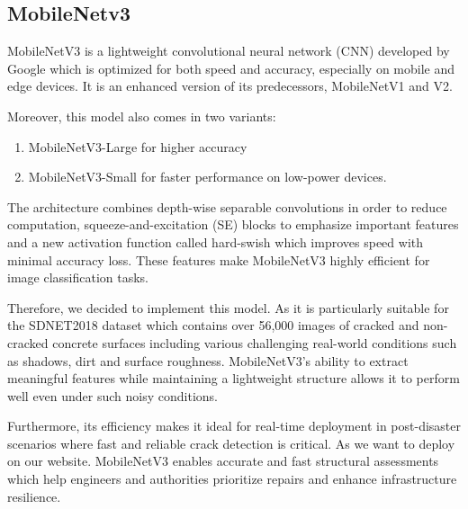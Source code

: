 \subsection{MobileNetv3}

MobileNetV3 is a lightweight convolutional neural network (CNN) developed by Google which is optimized for both speed and accuracy, especially on mobile and edge devices. It is an enhanced version of its predecessors, MobileNetV1 and V2.\cite{Qian2021}\cite{howard2019searchingmobilenetv3}

Moreover, this model also comes in two variants:

\begin{enumerate}
	\item MobileNetV3-Large for higher accuracy
	\item MobileNetV3-Small for faster performance on low-power devices.
\end{enumerate}

The architecture combines depth-wise separable convolutions in order to reduce computation, squeeze-and-excitation (SE) blocks to emphasize important features and a new activation function called hard-swish which improves speed with minimal accuracy loss. These features make MobileNetV3 highly efficient for image classification tasks.

Therefore, we decided to implement this model. As it is particularly suitable for the SDNET2018 dataset which contains over 56,000 images of cracked and non-cracked concrete surfaces including various challenging real-world conditions such as shadows, dirt and surface roughness. MobileNetV3’s ability to extract meaningful features while maintaining a lightweight structure allows it to perform well even under such noisy conditions.

Furthermore, its efficiency makes it ideal for real-time deployment in post-disaster scenarios where fast and reliable crack detection is critical. As we want to deploy on our website. MobileNetV3 enables accurate and fast structural assessments which help engineers and authorities prioritize repairs and enhance infrastructure resilience.

